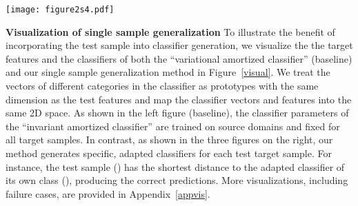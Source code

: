\documentclass{article} \usepackage[table]{xcolor}
\begin{document}
\begin{table}[t]
\centering
\caption{
\textbf{Influence of backbone}. The experiments are conducted on PACS over five runs. Only the average accuracy of four domains is shown in the Table. With larger and larger backbone models, our method achieves better and better performance gaps compared to the ERM baseline.
}
\vspace{-2mm}
\centering
\label{diffbackbone}
\vspace{-2mm}
\end{table}

\begin{figure*}[t] 
\centering 
\centerline{\texttt{[image: figure2s4.pdf]}} 
\vspace{-3mm}
\caption{\textbf{Visualization of single sample generalization} on the ``cartoon'' domain from PACS. 
Different shapes denote different categories. Samples are in red, classifiers in blue. 
Single sample generalization generates adapted classifiers for different target samples, leading to better classification. 
} 
\label{visual}
\vspace{-6mm}
\end{figure*} 


\textbf{Visualization of single sample generalization}
To illustrate the benefit of incorporating the test sample into classifier generation, we visualize the the target features and the classifiers of both the ``variational amortized classifier'' (baseline) and our single sample generalization method in Figure~\ref{visual}. 
We treat the vectors of different categories in the classifier as prototypes with the same dimension as the test features and map the classifier vectors and features into the same 2D space. 
As shown in the left figure (baseline), the classifier parameters of the ``invariant amortized classifier'' are trained on source domains and fixed for all target samples. 
In contrast, as shown in the three figures on the right, our method generates specific, adapted classifiers for each test target sample. For instance, the test sample () has the shortest distance to the adapted classifier of its own class (), producing the correct predictions. More visualizations, including failure cases, are provided in Appendix~\ref{appvis}.
\end{document}
